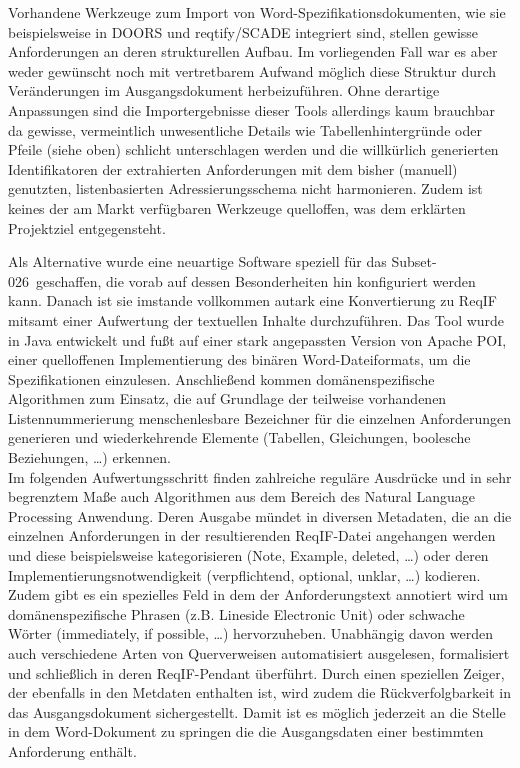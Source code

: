 \documentclass[twoside]{article}
\begin{document}
\begin{multicols}{2}
Vorhandene Werkzeuge zum Import von Word-Spezifikationsdokumenten, wie sie beispielsweise in DOORS und reqtify/SCADE integriert sind, stellen gewisse Anforderungen an deren strukturellen Aufbau. Im vorliegenden Fall war es aber weder gewünscht noch mit vertretbarem Aufwand möglich diese Struktur durch Veränderungen im Ausgangsdokument herbeizuführen. Ohne derartige Anpassungen sind die Importergebnisse dieser Tools allerdings kaum brauchbar da gewisse, vermeintlich unwesentliche Details wie Tabellenhintergründe oder Pfeile (siehe oben) schlicht unterschlagen werden und die willkürlich generierten Identifikatoren der extrahierten Anforderungen mit dem bisher (manuell) genutzten, listenbasierten Adressierungsschema nicht harmonieren. Zudem ist keines der am Markt verfügbaren Werkzeuge quelloffen, was dem erklärten Projektziel entgegensteht.

Als Alternative wurde eine neuartige Software speziell für das \glqq Subset-026\grqq\ geschaffen, die vorab auf dessen Besonderheiten hin konfiguriert werden kann. Danach ist sie imstande vollkommen autark eine Konvertierung zu ReqIF mitsamt einer Aufwertung der textuellen Inhalte durchzuführen. Das Tool wurde in Java entwickelt und fußt auf einer stark angepassten Version von Apache POI, einer quelloffenen Implementierung des binären Word-Dateiformats, um die Spezifikationen einzulesen. Anschließend kommen domänenspezifische Algorithmen zum Einsatz, die auf Grundlage der teilweise vorhandenen Listennummerierung menschenlesbare Bezeichner für die einzelnen Anforderungen generieren und wiederkehrende Elemente (Tabellen, Gleichungen, boolesche Beziehungen, \ldots ) erkennen.\\
Im folgenden Aufwertungsschritt finden zahlreiche reguläre Ausdrücke und in sehr begrenztem Maße auch Algorithmen aus dem Bereich des Natural Language Processing Anwendung. Deren Ausgabe mündet in diversen Metadaten, die an die einzelnen Anforderungen in der resultierenden ReqIF-Datei angehangen werden und diese beispielsweise kategorisieren (Note, Example, deleted, \ldots ) oder deren Implementierungsnotwendigkeit (verpflichtend, optional, unklar, \ldots ) kodieren. Zudem gibt es ein spezielles Feld in dem der Anforderungstext annotiert wird um domänenspezifische Phrasen (z.B. \glqq Lineside Electronic Unit\grqq ) oder schwache Wörter (\glqq immediately\grqq , \glqq if possible\grqq , \ldots ) hervorzuheben. Unabhängig davon werden auch verschiedene Arten von Querverweisen automatisiert ausgelesen, formalisiert und schließlich in deren ReqIF-Pendant überführt. Durch einen speziellen Zeiger, der ebenfalls in den Metdaten enthalten ist, wird zudem die Rückverfolgbarkeit in das Ausgangsdokument sichergestellt. Damit ist es möglich jederzeit an die Stelle in dem Word-Dokument zu springen die die Ausgangsdaten einer bestimmten Anforderung enthält.


\end{multicols}
\end{document}
